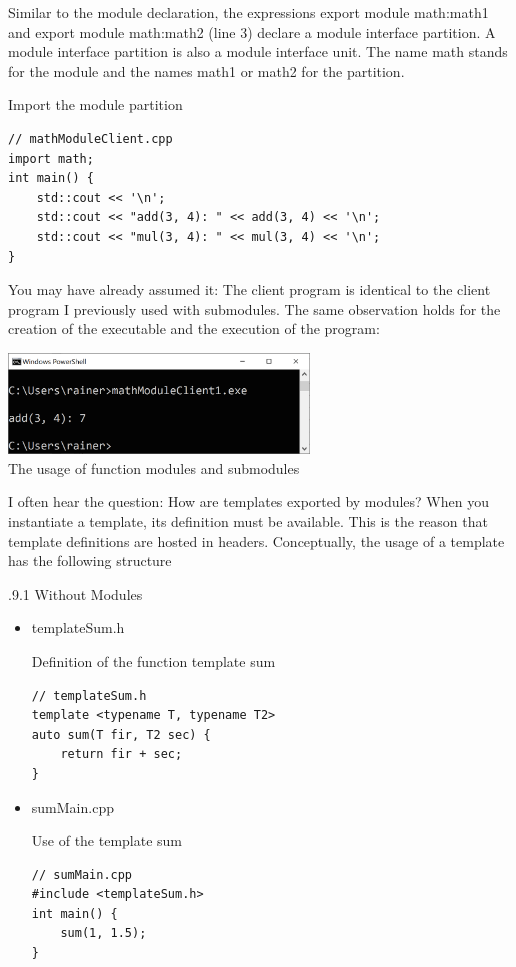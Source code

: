 Similar to the module declaration, the expressions export module math:math1 and export module math:math2 (line 3) declare a module interface partition. A module interface partition is also a module interface unit. The name math stands for the module and the names math1 or math2 for the partition.

\noindent
Import the module partition
\begin{lstlisting}[style=styleCXX]
// mathModuleClient.cpp
import math;
int main() {
	std::cout << '\n';
	std::cout << "add(3, 4): " << add(3, 4) << '\n';
	std::cout << "mul(3, 4): " << mul(3, 4) << '\n';
}
\end{lstlisting}

You may have already assumed it: The client program is identical to the client program I previously used with submodules. The same observation holds for the creation of the executable and the execution of the program:

\begin{center}
\includegraphics[width=0.6\textwidth]{content/3/chapter4/images/23.png}\\
The usage of function modules and submodules
\end{center}


I often hear the question: How are templates exported by modules? When you instantiate a template, its definition must be available. This is the reason that template definitions are hosted in headers. Conceptually, the usage of a template has the following structure

.9.1\hspace{0.2cm} Without Modules

\begin{itemize}
\item 
templateSum.h

\noindent
Definition of the function template sum
\begin{lstlisting}[style=styleCXX]
// templateSum.h
template <typename T, typename T2>
auto sum(T fir, T2 sec) {
	return fir + sec;
}
\end{lstlisting}

\item 
sumMain.cpp

\noindent
Use of the template sum
\begin{lstlisting}[style=styleCXX]
// sumMain.cpp
#include <templateSum.h>
int main() {
	sum(1, 1.5);
}
\end{lstlisting}
\end{itemize}

